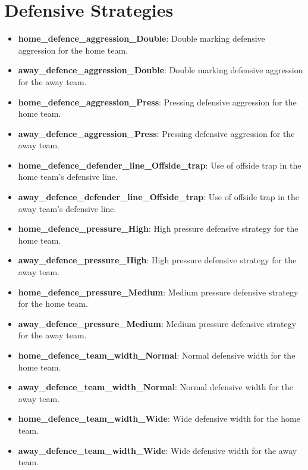 \section{Defensive Strategies}
\begin{itemize}
    \item \textbf{home\_defence\_aggression\_Double}: Double marking defensive aggression for the home team.
    \item \textbf{away\_defence\_aggression\_Double}: Double marking defensive aggression for the away team.
    \item \textbf{home\_defence\_aggression\_Press}: Pressing defensive aggression for the home team.
    \item \textbf{away\_defence\_aggression\_Press}: Pressing defensive aggression for the away team.
    \item \textbf{home\_defence\_defender\_line\_Offside\_trap}: Use of offside trap in the home team's defensive line.
    \item \textbf{away\_defence\_defender\_line\_Offside\_trap}: Use of offside trap in the away team's defensive line.
    \item \textbf{home\_defence\_pressure\_High}: High pressure defensive strategy for the home team.
    \item \textbf{away\_defence\_pressure\_High}: High pressure defensive strategy for the away team.
    \item \textbf{home\_defence\_pressure\_Medium}: Medium pressure defensive strategy for the home team.
    \item \textbf{away\_defence\_pressure\_Medium}: Medium pressure defensive strategy for the away team.
    \item \textbf{home\_defence\_team\_width\_Normal}: Normal defensive width for the home team.
    \item \textbf{away\_defence\_team\_width\_Normal}: Normal defensive width for the away team.
    \item \textbf{home\_defence\_team\_width\_Wide}: Wide defensive width for the home team.
    \item \textbf{away\_defence\_team\_width\_Wide}: Wide defensive width for the away team.
\end{itemize}

